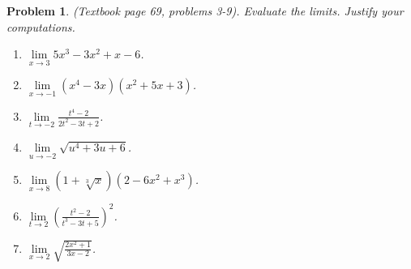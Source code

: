 \documentclass{article}
\newtheorem{problem}{Problem}
\begin{document}
\begin{problem}(Textbook page 69, problems 3-9). 
Evaluate the limits. Justify your computations.
\begin{multicols}{2}
\begin{enumerate}
\item $\displaystyle\lim\limits_{x\to 3} 5x^3-3x^2+x-6$.
\item $\displaystyle\lim\limits_{x\to -1} (x^4-3x)(x^2+5x+3)$.
\item $\displaystyle\lim\limits_{t\to -2}\frac{t^4-2}{2t^2-3t+2} $.
\item $\displaystyle\lim\limits_{u\to -2}\sqrt{u^4+3u +6}$.
\item $\displaystyle\lim\limits_{x \to 8}(1+\sqrt[3]{x})(2-6x^2+x^3)$.
\item $\displaystyle\lim\limits_{t \to 2}\left(\frac{t^2-2}{t^3-3t+5} \right)^2$.
\item $\displaystyle\lim\limits_{x\to 2}\sqrt{\frac{2x^2+1}{3x-2}}$.
\end{enumerate}
\end{multicols}
\end{problem}
\end{document}
